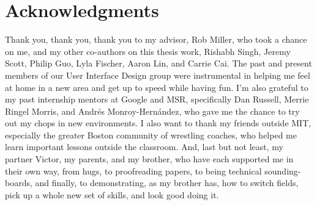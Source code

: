 \cleardoublepage

\section*{Acknowledgments}

Thank you, thank you, thank you to my advisor, Rob Miller, who took a chance on me, and my other co-authors on this thesis work, Rishabh Singh, Jeremy Scott, Philip Guo, Lyla Fischer, Aaron Lin, and Carrie Cai. The past and present members of our User Interface Design group were instrumental in helping me feel at home in a new area and get up to speed while having fun. I'm also grateful to my past internship mentors at Google and MSR, specifically Dan Russell, Merrie Ringel Morris, and Andr\'{e}s Monroy-Hern\'{a}ndez, who gave me the chance to try out my chops in new environments. I also want to thank my friends outside MIT, especially the greater Boston community of wrestling coaches, who helped me learn important lessons outside the classroom. And, last but not least, my partner Victor, my parents, and my brother, who have each supported me in their own way, from hugs, to proofreading papers, to being technical sounding-boards, and finally, to demonstrating, as my brother has, how to switch fields, pick up a whole new set of skills, and look good doing it.



